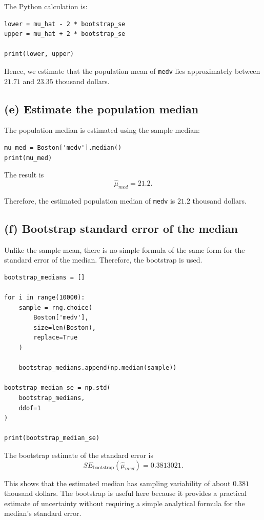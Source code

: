 \documentclass[12pt,a4paper]{article}
\begin{document}
The Python calculation is:

\begin{lstlisting}
lower = mu_hat - 2 * bootstrap_se
upper = mu_hat + 2 * bootstrap_se

print(lower, upper)
\end{lstlisting}

Hence, we estimate that the population mean of \texttt{medv} lies
approximately between $21.71$ and $23.35$ thousand dollars.

\subsection*{(e) Estimate the population median}

The population median is estimated using the sample median:

\begin{lstlisting}
mu_med = Boston['medv'].median()
print(mu_med)
\end{lstlisting}

The result is
\[
\boxed{\hat{\mu}_{med}=21.2}.
\]

Therefore, the estimated population median of \texttt{medv} is
$21.2$ thousand dollars.

\subsection*{(f) Bootstrap standard error of the median}

Unlike the sample mean, there is no simple formula of the same form for
the standard error of the median. Therefore, the bootstrap is used.

\begin{lstlisting}
bootstrap_medians = []

for i in range(10000):
    sample = rng.choice(
        Boston['medv'],
        size=len(Boston),
        replace=True
    )

    bootstrap_medians.append(np.median(sample))

bootstrap_median_se = np.std(
    bootstrap_medians,
    ddof=1
)

print(bootstrap_median_se)
\end{lstlisting}

The bootstrap estimate of the standard error is
\[
\boxed{SE_{\text{bootstrap}}(\hat{\mu}_{med})=0.3813021}.
\]

This shows that the estimated median has sampling variability of about
$0.381$ thousand dollars. The bootstrap is useful here because it
provides a practical estimate of uncertainty without requiring a simple
analytical formula for the median's standard error.
\end{document}
